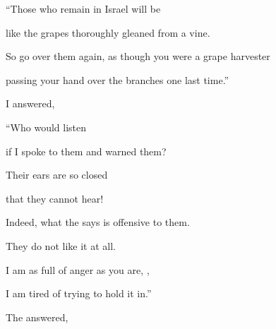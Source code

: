 {\par }{\Q “Those who remain
in Israel
will be
\par }{\Q like the grapes thoroughly gleaned
from a vine.
\par }{\Q So go over them again, as though you were a grape harvester
\par }{\Q passing your hand
over
the branches one last time.”
\par }{\PP {}I answered,

\par }{\Q “Who
would listen
\par }{\Q if I spoke
to them and warned
them?

\par }{\Q Their ears
are so closed
\par }{\Q that they cannot
hear!
\par }{\Q Indeed,
what
the {}
says
is offensive
to them.
\par }{\Q They do not
like it at all.
\par }{\Q {}I am as full
of anger
as you are,
{},

\par }{\Q I am tired
of trying to hold
it in.”
\par }{\PP The
{} answered,

}
